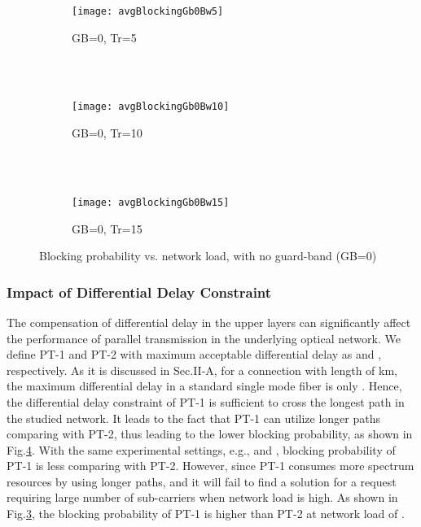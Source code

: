 \documentclass[conference]{IEEEtran}
\begin{document}
\begin{figure}
        \centering
        \begin{subfigure}[b]{0.47\textwidth}
                \centering
                \texttt{[image: avgBlockingGb0Bw5]}
                \caption{ GB=0, Tr=5 }
                \label{fig:gb0-1}
        \end{subfigure} \\
        ~ \begin{subfigure}[b]{0.47\textwidth}
                \centering
                \texttt{[image: avgBlockingGb0Bw10]}
                \caption{ GB=0, Tr=10}
                \label{fig:gb0-2}
        \end{subfigure}\\
        ~ \begin{subfigure}[b]{0.47\textwidth}
                \centering
                \texttt{[image: avgBlockingGb0Bw15]}
                \caption{GB=0, Tr=15}
                \label{fig:gb0-3}
        \end{subfigure}
        \caption{Blocking probability vs. network load, with no guard-band (GB=0)}\label{fig:gb0} 
\end{figure} 

\subsubsection{Impact of Differential Delay Constraint}
The compensation of differential delay in the upper layers can significantly  affect the performance of parallel 
transmission in the underlying optical network. We define PT-1 and PT-2 with maximum acceptable differential 
delay as  and , respectively. As it is discussed in Sec.II-A, for a connection with length of km, the maximum differential delay in a standard single mode fiber is only . Hence,  the differential delay 
constraint of PT-1 is sufficient to cross the longest path in the studied network. It leads to the fact that PT-1 can utilize 
longer paths comparing with PT-2, thus leading to the lower blocking probability, as shown in Fig.\ref{fig:gb0}. With the 
same experimental settings, e.g.,  and , blocking probability of PT-1 is  less comparing 
with PT-2. However, since PT-1 consumes more spectrum resources by using longer paths, and it will fail to find a solution 
for a request requiring large number of sub-carriers when network load is high. As shown in Fig.\ref{fig:gb0-3}, the 
blocking probability of PT-1 is  higher than PT-2 at network load of .
\end{document}
